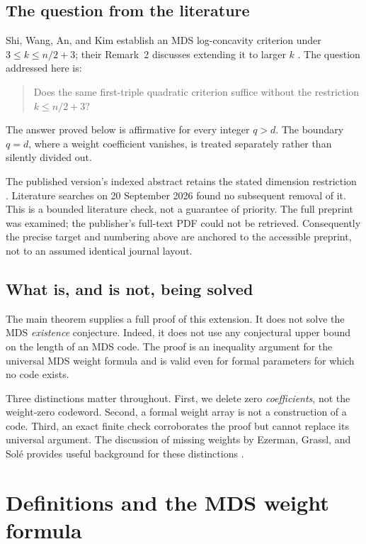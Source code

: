 \documentclass[11pt,letterpaper]{article}
\numberwithin{equation}{section}
\theoremstyle{definition}
\begin{document}
\subsection{The question from the literature}
Shi, Wang, An, and Kim establish an MDS log-concavity criterion under
$3\le k\le n/2+3$; their Remark~2 discusses extending it to larger
$k$ \cite[Theorem~9 and Remark~2]{SWAK}. The question addressed here is:
\begin{quote}
Does the same first-triple quadratic criterion suffice without the
restriction $k\le n/2+3$?
\end{quote}
The answer proved below is affirmative for every integer $q>d$.
The boundary $q=d$, where a weight coefficient vanishes, is treated
separately rather than silently divided out.

The published version's indexed abstract retains the stated dimension
restriction \cite{SWAKjournal}. Literature searches on 20 September 2026
found no subsequent removal of it. This is a bounded literature check,
not a guarantee of priority. The full preprint was examined; the
publisher's full-text PDF could not be retrieved. Consequently the
precise target and numbering above are anchored to the accessible
preprint, not to an assumed identical journal layout.

\subsection{What is, and is not, being solved}
The main theorem supplies a full proof of this extension. It does not
solve the MDS \emph{existence} conjecture. Indeed, it does not use any
conjectural upper bound on the length of an MDS code. The proof is an
inequality argument for the universal MDS weight formula and is valid
even for formal parameters for which no code exists.

Three distinctions matter throughout. First, we delete zero
\emph{coefficients}, not the weight-zero codeword. Second, a formal
weight array is not a construction of a code. Third, an exact finite
check corroborates the proof but cannot replace its universal argument.
The discussion of missing weights by Ezerman, Grassl, and Sol\'e
provides useful background for these distinctions \cite{EGS}.

\section{Definitions and the MDS weight formula}
\end{document}
